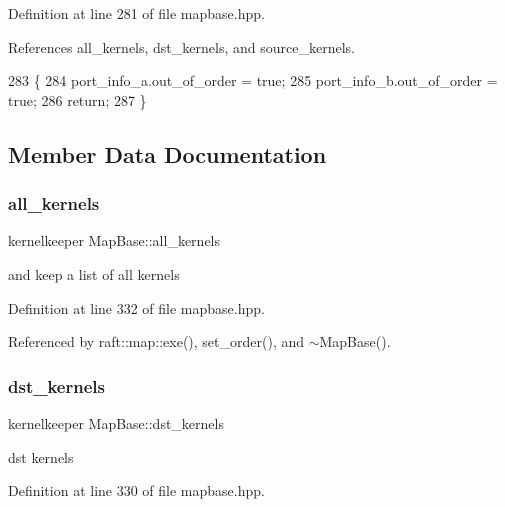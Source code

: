Definition at line 281 of file mapbase.\+hpp.



References all\+\_\+kernels, dst\+\_\+kernels, and source\+\_\+kernels.


\begin{DoxyCode}
283    \{
284         port\_info\_a.out\_of\_order = \textcolor{keyword}{true}; 
285         port\_info\_b.out\_of\_order = \textcolor{keyword}{true}; 
286         \textcolor{keywordflow}{return};
287    \}
\end{DoxyCode}


\subsection{Member Data Documentation}
\hypertarget{class_map_base_a2220cd630c5d00708f08d9bc70a48220}{}\label{class_map_base_a2220cd630c5d00708f08d9bc70a48220} 
\subsubsection{\texorpdfstring{all\+\_\+kernels}{all\_kernels}}
{\footnotesize\ttfamily kernelkeeper Map\+Base\+::all\+\_\+kernels\hspace{0.3cm}{\ttfamily [protected]}}

and keep a list of all kernels 

Definition at line 332 of file mapbase.\+hpp.



Referenced by raft\+::map\+::exe(), set\+\_\+order(), and $\sim$\+Map\+Base().

\hypertarget{class_map_base_a83bb7ac6b0e80882356946d19da7ce4a}{}\label{class_map_base_a83bb7ac6b0e80882356946d19da7ce4a} 
\subsubsection{\texorpdfstring{dst\+\_\+kernels}{dst\_kernels}}
{\footnotesize\ttfamily kernelkeeper Map\+Base\+::dst\+\_\+kernels\hspace{0.3cm}{\ttfamily [protected]}}

dst kernels 

Definition at line 330 of file mapbase.\+hpp.



